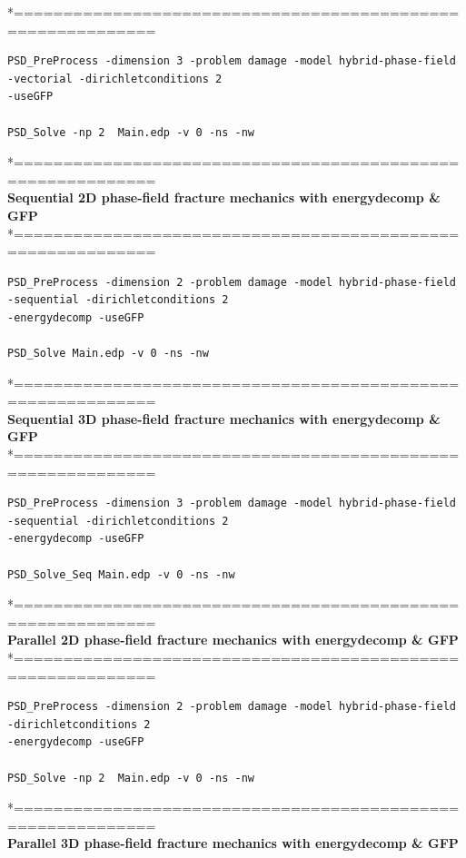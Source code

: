*============================================================\\
\begin{lstlisting}[style=Linux]
PSD_PreProcess -dimension 3 -problem damage -model hybrid-phase-field -vectorial -dirichletconditions 2 
-useGFP   

PSD_Solve -np 2  Main.edp -v 0 -ns -nw   
\end{lstlisting}
*============================================================\\
 \textbf{Sequential 2D phase-field fracture mechanics with energydecomp \& GFP} \\
*============================================================\\
\begin{lstlisting}[style=Linux]
PSD_PreProcess -dimension 2 -problem damage -model hybrid-phase-field -sequential -dirichletconditions 2 
-energydecomp -useGFP   

PSD_Solve Main.edp -v 0 -ns -nw   
\end{lstlisting}
*============================================================\\
\textbf{ Sequential 3D phase-field fracture mechanics with energydecomp \& GFP} \\
*============================================================\\
\begin{lstlisting}[style=Linux]
PSD_PreProcess -dimension 3 -problem damage -model hybrid-phase-field -sequential -dirichletconditions 2 
-energydecomp -useGFP   

PSD_Solve_Seq Main.edp -v 0 -ns -nw   
\end{lstlisting}
*============================================================\\
 \textbf{Parallel 2D phase-field fracture mechanics with energydecomp \& GFP} \\
*============================================================\\
\begin{lstlisting}[style=Linux]
PSD_PreProcess -dimension 2 -problem damage -model hybrid-phase-field -dirichletconditions 2 
-energydecomp -useGFP  

PSD_Solve -np 2  Main.edp -v 0 -ns -nw   
\end{lstlisting}
*============================================================\\
\textbf{ Parallel 3D phase-field fracture mechanics with energydecomp \& GFP} \\
